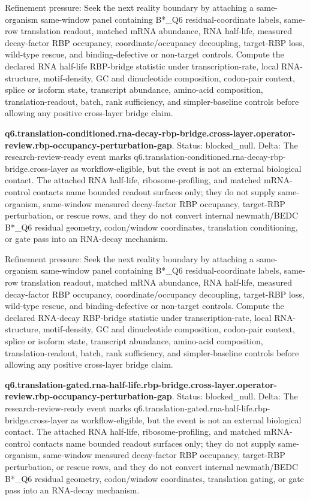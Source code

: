 Refinement pressure: Seek the next reality boundary by attaching a same-organism same-window panel containing B*\_Q6 residual-coordinate labels, same-row translation readout, matched mRNA abundance, RNA half-life, measured decay-factor RBP occupancy, coordinate/occupancy decoupling, target-RBP loss, wild-type rescue, and binding-defective or non-target controls. Compute the declared RNA half-life RBP-bridge statistic under transcription-rate, local RNA-structure, motif-density, GC and dinucleotide composition, codon-pair context, splice or isoform state, transcript abundance, amino-acid composition, translation-readout, batch, rank sufficiency, and simpler-baseline controls before allowing any positive cross-layer bridge claim.

\textbf{q6.translation-conditioned.rna-decay-rbp-bridge.cross-layer.operator-review.rbp-occupancy-perturbation-gap}. Status: blocked\_null. Delta: The research-review-ready event marks q6.translation-conditioned.rna-decay-rbp-bridge.cross-layer as workflow-eligible, but the event is not an external biological contact. The attached RNA half-life, ribosome-profiling, and matched mRNA-control contacts name bounded readout surfaces only; they do not supply same-organism, same-window measured decay-factor RBP occupancy, target-RBP perturbation, or rescue rows, and they do not convert internal newmath/BEDC B*\_Q6 residual geometry, codon/window coordinates, translation conditioning, or gate pass into an RNA-decay mechanism.

Refinement pressure: Seek the next reality boundary by attaching a same-organism same-window panel containing B*\_Q6 residual-coordinate labels, same-row translation readout, matched mRNA abundance, RNA half-life, measured decay-factor RBP occupancy, coordinate/occupancy decoupling, target-RBP loss, wild-type rescue, and binding-defective or non-target controls. Compute the declared RNA-decay RBP-bridge statistic under transcription-rate, local RNA-structure, motif-density, GC and dinucleotide composition, codon-pair context, splice or isoform state, transcript abundance, amino-acid composition, translation-readout, batch, rank sufficiency, and simpler-baseline controls before allowing any positive cross-layer bridge claim.

\textbf{q6.translation-gated.rna-half-life.rbp-bridge.cross-layer.operator-review.rbp-occupancy-perturbation-gap}. Status: blocked\_null. Delta: The research-review-ready event marks q6.translation-gated.rna-half-life.rbp-bridge.cross-layer as workflow-eligible, but the event is not an external biological contact. The attached RNA half-life, ribosome-profiling, and matched mRNA-control contacts name bounded readout surfaces only; they do not supply same-organism, same-window measured decay-factor RBP occupancy, target-RBP perturbation, or rescue rows, and they do not convert internal newmath/BEDC B*\_Q6 residual geometry, codon/window coordinates, translation gating, or gate pass into an RNA-decay mechanism.

